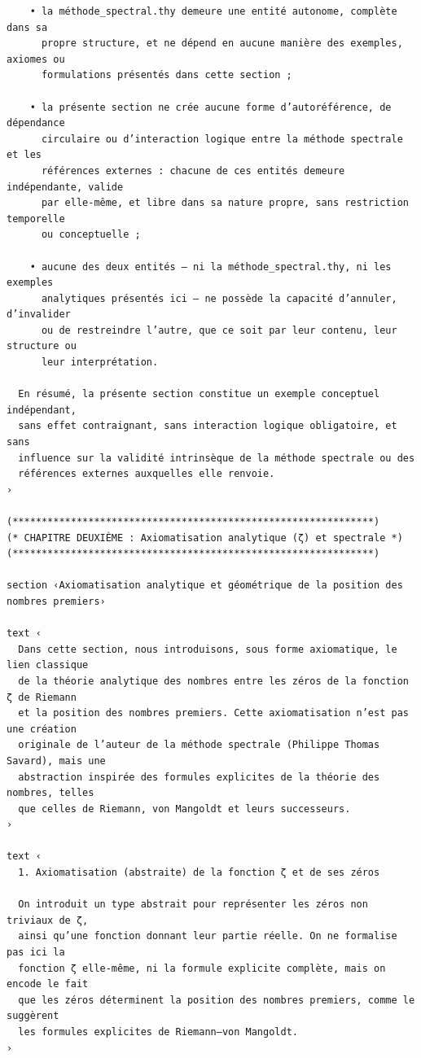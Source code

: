 \documentclass[a4paper,11pt]{article}
\begin{document}
\begin{holcode}[title={\textcolor{white}{Fichier : methode\_spectral.thy -- Partie 1/4}}]
\begin{lstlisting}
    • la méthode_spectral.thy demeure une entité autonome, complète dans sa
      propre structure, et ne dépend en aucune manière des exemples, axiomes ou
      formulations présentés dans cette section ;

    • la présente section ne crée aucune forme d’autoréférence, de dépendance
      circulaire ou d’interaction logique entre la méthode spectrale et les
      références externes : chacune de ces entités demeure indépendante, valide
      par elle-même, et libre dans sa nature propre, sans restriction temporelle
      ou conceptuelle ;

    • aucune des deux entités — ni la méthode_spectral.thy, ni les exemples
      analytiques présentés ici — ne possède la capacité d’annuler, d’invalider
      ou de restreindre l’autre, que ce soit par leur contenu, leur structure ou
      leur interprétation.

  En résumé, la présente section constitue un exemple conceptuel indépendant,
  sans effet contraignant, sans interaction logique obligatoire, et sans
  influence sur la validité intrinsèque de la méthode spectrale ou des
  références externes auxquelles elle renvoie.
›

(**************************************************************)
(* CHAPITRE DEUXIÈME : Axiomatisation analytique (ζ) et spectrale *)
(**************************************************************)

section ‹Axiomatisation analytique et géométrique de la position des nombres premiers›

text ‹
  Dans cette section, nous introduisons, sous forme axiomatique, le lien classique
  de la théorie analytique des nombres entre les zéros de la fonction ζ de Riemann
  et la position des nombres premiers. Cette axiomatisation n’est pas une création
  originale de l’auteur de la méthode spectrale (Philippe Thomas Savard), mais une
  abstraction inspirée des formules explicites de la théorie des nombres, telles
  que celles de Riemann, von Mangoldt et leurs successeurs.
›

text ‹
  1. Axiomatisation (abstraite) de la fonction ζ et de ses zéros

  On introduit un type abstrait pour représenter les zéros non triviaux de ζ,
  ainsi qu’une fonction donnant leur partie réelle. On ne formalise pas ici la
  fonction ζ elle-même, ni la formule explicite complète, mais on encode le fait
  que les zéros déterminent la position des nombres premiers, comme le suggèrent
  les formules explicites de Riemann–von Mangoldt.
›


\end{lstlisting}
\end{holcode}
\end{document}
